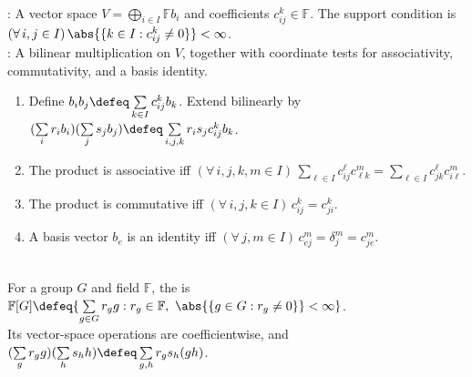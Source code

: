 \begin{computationmethod} \label{meth:structure-constants-algebra} \\
: A vector space $V=\bigoplus\limits_{i\in I}\mathbb{F}b_i$ and coefficients $c_{ij}^k\in\mathbb{F}$. The support condition is $(\forall\,i,j\in I)\,\abs{\{k\in I:c_{ij}^k\neq0\}}<\infty$.\\
: A bilinear multiplication on $V$, together with coordinate tests for associativity, commutativity, and a basis identity.
\begin{enumerate}[label=(\roman*)]
\setlength{\itemsep}{0pt}
\item Define $b_ib_j\defeq\sum\limits_{k\in I}c_{ij}^kb_k$. Extend bilinearly by $(\sum\limits_i r_ib_i)(\sum\limits_j s_jb_j)\defeq\sum\limits_{i,j,k}r_is_jc_{ij}^kb_k$.
\item The product is associative iff $(\forall\,i,j,k,m\in I)\,\sum\limits_{\ell\in I}c_{ij}^{\ell}c_{\ell k}^{m}=\sum\limits_{\ell\in I}c_{jk}^{\ell}c_{i\ell}^{m}$.
\item The product is commutative iff $(\forall\,i,j,k\in I)\,c_{ij}^k=c_{ji}^k$.
\item A basis vector $b_e$ is an identity iff $(\forall\,j,m\in I)\,c_{ej}^m=\delta_j^m=c_{je}^m$.
\end{enumerate}
\end{computationmethod}

\begin{definition} \label{def:group-algebra} \\
For a group $G$ and field $\mathbb{F}$, the  is $\mathbb{F}[G]\defeq\{\sum\limits_{g\in G}r_gg:r_g\in\mathbb{F},\ \abs{\{g\in G:r_g\neq0\}}<\infty\}$.\\
Its vector-space operations are coefficientwise, and $(\sum\limits_g r_gg)(\sum\limits_h s_hh)\defeq\sum\limits_{g,h}r_gs_h(gh)$.
\end{definition}

